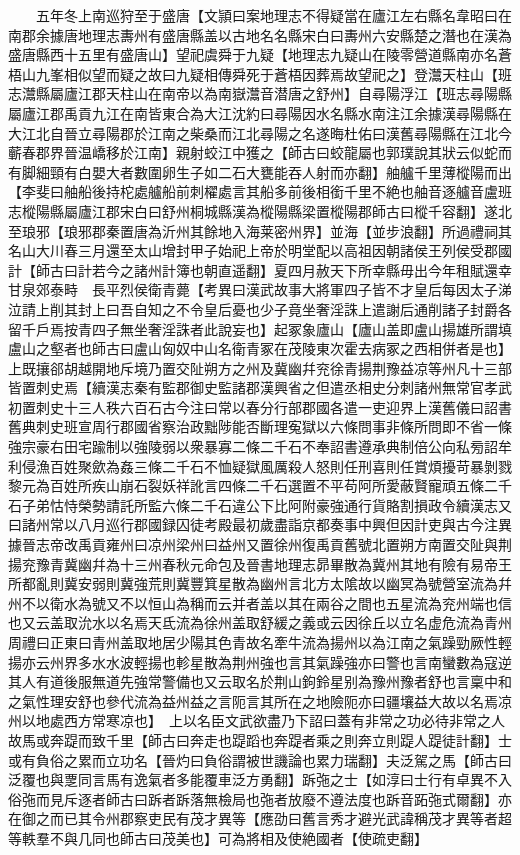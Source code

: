 　　五年冬上南巡狩至于盛唐【文頴曰案地理志不得疑當在廬江左右縣名韋昭曰在南郡余據唐地理志夀州有盛唐縣盖以古地名名縣宋白曰夀州六安縣楚之潛也在漢為盛唐縣西十五里有盛唐山】望祀虞舜于九疑【地理志九疑山在陵零營道縣南亦名蒼梧山九峯相似望而疑之故曰九疑相傳舜死于蒼梧因葬焉故望祀之】登灊天柱山【班志灊縣屬廬江郡天柱山在南帝以為南嶽灊音潜唐之舒州】自尋陽浮江【班志尋陽縣屬廬江郡禹貢九江在南皆東合為大江沈約曰尋陽因水名縣水南注江余據漢尋陽縣在大江北自晉立尋陽郡於江南之柴桑而江北尋陽之名遂晦杜佑曰漢舊尋陽縣在江北今蘄春郡界晉温嶠移於江南】親射蛟江中獲之【師古曰蛟龍屬也郭璞說其狀云似蛇而有脚細頸有白嬰大者數圍卵生子如二石大甕能吞人射而亦翻】舳艫千里薄樅陽而出【李斐曰舳船後持柁處艫船前刺櫂處言其船多前後相銜千里不絶也舳音逐艫音盧班志樅陽縣屬廬江郡宋白曰舒州桐城縣漢為樅陽縣梁置樅陽郡師古曰樅千容翻】遂北至琅邪【琅邪郡秦置唐為沂州其餘地入海莱密州界】並海【並步浪翻】所過禮祠其名山大川春三月還至太山增封甲子始祀上帝於明堂配以高祖因朝諸侯王列侯受郡國計【師古曰計若今之諸州計簿也朝直遥翻】夏四月赦天下所幸縣毋出今年租賦還幸甘泉郊泰畤　長平烈侯衛青薨【考異曰漢武故事大將軍四子皆不才皇后每因太子涕泣請上削其封上曰吾自知之不令皇后憂也少子竟坐奢淫誅上遣謝后通削諸子封爵各留千戶焉按青四子無坐奢淫誅者此說妄也】起冢象廬山【廬山盖即盧山揚雄所謂填盧山之壑者也師古曰盧山匈奴中山名衛青冢在茂陵東次霍去病冢之西相併者是也】上既攘郤胡越開地斥境乃置交阯朔方之州及冀幽幷兖徐青揚荆豫益凉等州凡十三部皆置刺史焉【續漢志秦有監郡御史監諸郡漢興省之但遣丞相史分刺諸州無常官孝武初置刺史十三人秩六百石古今注曰常以春分行部郡國各遣一吏迎界上漢舊儀曰詔書舊典刺史班宣周行郡國省察治政黜陟能否斷理寃獄以六條問事非條所問即不省一條強宗豪右田宅踰制以強陵弱以衆暴寡二條二千石不奉詔書遵承典制倍公向私㫄詔牟利侵漁百姓聚歛為姦三條二千石不恤疑獄風厲殺人怒則任刑喜則任賞煩擾苛暴剝戮黎元為百姓所疾山崩石裂妖祥訛言四條二千石選置不平苟阿所愛蔽賢寵頑五條二千石子弟怙恃榮勢請託所監六條二千石違公下比阿附豪強通行貨賂割損政令續漢志又曰諸州常以八月巡行郡國録囚徒考殿最初歲盡詣京都奏事中興但因計吏與古今注異據晉志帝改禹貢雍州曰凉州梁州曰益州又置徐州復禹貢舊號北置朔方南置交阯與荆揚兖豫青冀幽幷為十三州春秋元命包及晉書地理志昴畢散為冀州其地有險有易帝王所都亂則冀安弱則冀強荒則冀豐箕星散為幽州言北方太隂故以幽冥為號營室流為幷州不以衛水為號又不以恒山為稱而云并者盖以其在兩谷之間也五星流為兖州端也信也又云盖取沇水以名焉天氐流為徐州盖取舒緩之義或云因徐丘以立名虚危流為青州周禮曰正東曰青州盖取地居少陽其色青故名牽牛流為揚州以為江南之氣躁勁厥性輕揚亦云州界多水水波輕揚也軫星散為荆州強也言其氣躁強亦曰警也言南蠻數為寇逆其人有道後服無道先強常警備也又云取名於荆山鉤鈴星别為豫州豫者舒也言稟中和之氣性理安舒也參代流為益州益之言阨言其所在之地險阨亦曰疆壤益大故以名焉凉州以地處西方常寒凉也】　上以名臣文武欲盡乃下詔曰蓋有非常之功必待非常之人故馬或奔踶而致千里【師古曰奔走也踶蹈也奔踶者乘之則奔立則踶人踶徒計翻】士或有負俗之累而立功名【晉灼曰負俗謂被世譏論也累力瑞翻】夫泛駕之馬【師古曰泛覆也與覂同言馬有逸氣者多能覆車泛方勇翻】跅㢮之士【如淳曰士行有卓異不入俗㢮而見斥逐者師古曰跅者跅落無檢局也㢮者放廢不遵法度也跅音跖㢮式爾翻】亦在御之而已其令州郡察吏民有茂才異等【應劭曰舊言秀才避光武諱稱茂才異等者超等軼羣不與几同也師古曰茂美也】可為將相及使絶國者【使疏吏翻】

